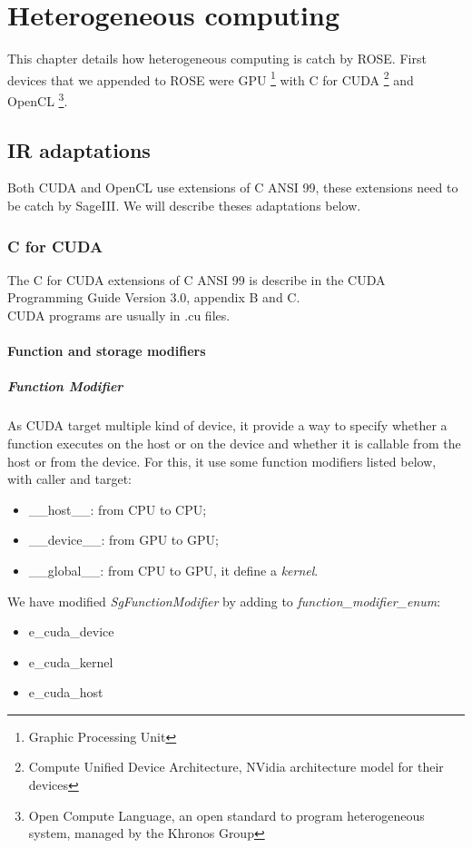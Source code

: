 \chapter{Heterogeneous computing}

\label{heterogeneous:heterogeneous}

This chapter details how heterogeneous computing is catch by ROSE. First devices that we appended to ROSE were GPU \footnote{Graphic Processing Unit}
with C for CUDA \footnote{Compute Unified Device Architecture, NVidia architecture model for their devices} and OpenCL \footnote{Open Compute Language,
an open standard to program heterogeneous system, managed by the Khronos Group}.

	\section{IR adaptations}
	
		Both CUDA and OpenCL use extensions of C ANSI 99, these extensions need to be catch by SageIII. We will describe theses adaptations below.

		\subsection{C for CUDA}
		
			The C for CUDA extensions of C ANSI 99 is describe in the CUDA Programming Guide Version 3.0, appendix B and C.\\
			CUDA programs are usually in .cu files.
		
			\subsubsection{Function and storage modifiers}

				\paragraph{Function Modifier}

As CUDA target multiple kind of device, it provide a way to specify whether a function executes on the host or on the device and whether it is
callable from the host or from the device. For this, it use some function modifiers listed below, with caller and target:
\begin{itemize}
	\item \_\_host\_\_: from CPU to CPU;
	\item \_\_device\_\_: from GPU to GPU;
	\item \_\_global\_\_: from CPU to GPU, it define a \emph{kernel}.
\end{itemize}
We have modified \emph{SgFunctionModifier} by adding to \emph{function\_modifier\_enum}:
\begin{itemize}
	\item e\_cuda\_device
	\item e\_cuda\_kernel
	\item e\_cuda\_host
\end{itemize}

